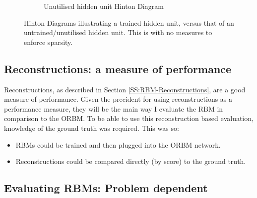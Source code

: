 \begin{figure}[htb]
\begin{subfigure}[t]{0.3\textwidth}
      \caption{Unutilised hidden unit Hinton Diagram}
      \label{F:Hinton-Bad}
  \end{subfigure}
  \caption{Hinton Diagrams illustrating a trained hidden unit, versus that of an untrained/unutilised hidden unit. This is with no measures to enforce sparsity.}\label{fig:mnist-worse-best-results}
\end{figure}

\subsection{Reconstructions: a measure of performance}

Reconstructions, as described in Section \ref{SS:RBM-Reconstructions}, are a good measure of performance.  Given the precident for using reconstructions as a performance measure, they will be the main way I evaluate the RBM in comparison to the ORBM. To be able to use this reconstruction based evaluation, knowledge of the ground truth was required. This was so:
\begin{itemize}
  \item RBMs could be trained and then plugged into the ORBM network.
  \item Reconstructions could be compared directly (by score) to the ground truth.
\end{itemize}



\subsection{Evaluating RBMs: Problem dependent}

